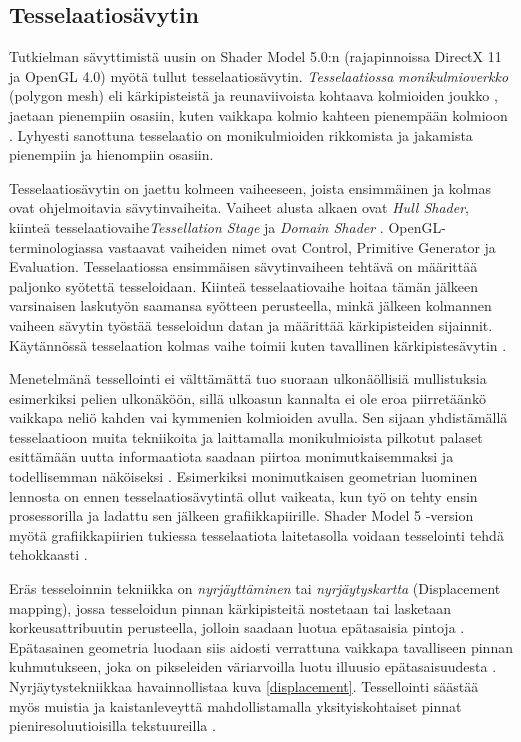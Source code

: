 \documentclass[finnish]{tktltiki2}
\theoremstyle{definition}
\theoremstyle{remark}
\begin{document}
\subsection{Tesselaatiosävytin}

Tutkielman sävyttimistä uusin on Shader Model 5.0:n (rajapinnoissa DirectX 11 ja OpenGL 4.0) myötä tullut tesselaatiosävytin. \emph{Tesselaatiossa} \emph{monikulmioverkko} (polygon mesh) eli kärkipisteistä ja reunaviivoista kohtaava kolmioiden joukko \cite[s. 49-50]{Puh08}, jaetaan pienempiin osasiin, kuten vaikkapa kolmio kahteen pienempään kolmioon \cite{Nvi10}. Lyhyesti sanottuna tesselaatio on monikulmioiden rikkomista ja jakamista pienempiin ja hienompiin osasiin. 

Tesselaatiosävytin on jaettu kolmeen vaiheeseen, joista ensimmäinen ja kolmas ovat ohjelmoitavia sävytinvaiheita. Vaiheet alusta alkaen ovat \emph{Hull Shader}, kiinteä tesselaatiovaihe\emph{Tessellation Stage} ja \emph{Domain Shader} \cite{Mic11}. OpenGL-terminologiassa vastaavat vaiheiden nimet ovat Control, Primitive Generator ja Evaluation. Tesselaatiossa ensimmäisen sävytinvaiheen tehtävä on määrittää paljonko syötettä tesseloidaan. Kiinteä tesselaatiovaihe hoitaa tämän jälkeen varsinaisen laskutyön saamansa syötteen perusteella, minkä jälkeen kolmannen vaiheen sävytin työstää tesseloidun datan ja määrittää kärkipisteiden sijainnit. Käytännössä tesselaation kolmas vaihe toimii kuten tavallinen kärkipistesävytin \cite{Mic11}.

Menetelmänä tessellointi ei välttämättä tuo suoraan ulkonäöllisiä mullistuksia esimerkiksi pelien ulkonäköön, sillä ulkoasun kannalta ei ole eroa piirretäänkö vaikkapa neliö kahden vai kymmenien kolmioiden avulla. Sen sijaan yhdistämällä tesselaatioon muita tekniikoita ja laittamalla monikulmioista pilkotut palaset esittämään uutta informaatiota saadaan piirtoa monimutkaisemmaksi ja todellisemman näköiseksi \cite{Nvi10}. Esimerkiksi monimutkaisen geometrian luominen lennosta on ennen tesselaatiosävytintä ollut vaikeata, kun työ on tehty ensin prosessorilla ja ladattu sen jälkeen grafiikkapiirille. Shader Model 5 -version myötä grafiikkapiirien tukiessa tesselaatiota laitetasolla voidaan tesselointi tehdä tehokkaasti \cite{Sch14}.

Eräs tesseloinnin tekniikka on \emph{nyrjäyttäminen} tai \emph{nyrjäytyskartta} (Displacement mapping), jossa tesseloidun pinnan kärkipisteitä nostetaan tai lasketaan korkeusattribuutin perusteella, jolloin saadaan luotua epätasaisia pintoja \cite{Nvi10}. Epätasainen geometria luodaan siis aidosti verrattuna vaikkapa tavalliseen pinnan kuhmutukseen, joka on pikseleiden väriarvoilla luotu illuusio epätasaisuudesta \cite{Gre14}. Nyrjäytystekniikkaa havainnollistaa kuva \ref{displacement}. Tessellointi säästää myös muistia ja kaistanleveyttä mahdollistamalla yksityiskohtaiset pinnat pieniresoluutioisilla tekstuureilla \cite{Mic11} \cite{Nvi10}.
\end{document}
